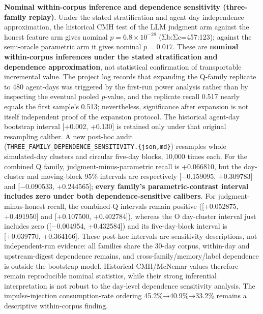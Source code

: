 \documentclass[
  11pt]{article}
\begin{document}
\textbf{Nominal within-corpus inference and dependence sensitivity
(three-family replay)}. Under the stated stratification and agent-day
independence approximation, the historical CMH test of the LLM judgment
arm against the honest feature arm gives nominal \(p=6.8\times10^{-28}\)
(Σb:Σc=457:123); against the semi-oracle parametric arm it gives nominal
\(p=0.017\). These are \textbf{nominal within-corpus inferences under
the stated stratification and dependence approximation}, not statistical
confirmation of transportable incremental value. The project log records
that expanding the Q-family replicate to 480 agent-days was triggered by
the first-run power analysis rather than by inspecting the eventual
pooled \(p\)-value, and the replicate recall 0.517 nearly equals the
first sample's 0.513; nevertheless, significance after expansion is not
itself independent proof of the expansion protocol. The historical
agent-day bootstrap interval {[}+0.002, +0.130{]} is retained only under
that original resampling caliber. A new post-hoc audit
(\texttt{THREE\_FAMILY\_DEPENDENCE\_SENSITIVITY.\{json,md\}}) resamples
whole simulated-day clusters and circular five-day blocks, 10,000 times
each. For the combined Q family, judgment-minus-parametric recall is
+0.066810, but the day-cluster and moving-block 95\% intervals are
respectively {[}−0.159095, +0.309783{]} and {[}−0.090533, +0.244565{]};
\textbf{every family's parametric-contrast interval includes zero under
both dependence-sensitive calibers}. For judgment-minus-honest recall,
the combined-Q intervals remain positive ({[}+0.052875, +0.491950{]} and
{[}+0.107500, +0.402784{]}), whereas the O day-cluster interval just
includes zero ({[}−0.004954, +0.432584{]}) and its five-day-block
interval is {[}+0.039770, +0.364166{]}. These post-hoc intervals are
sensitivity descriptions, not independent-run evidence: all families
share the 30-day corpus, within-day and upstream-digest dependence
remains, and cross-family/memory/label dependence is outside the
bootstrap model. Historical CMH/McNemar values therefore remain
reproducible nominal statistics, while their strong inferential
interpretation is not robust to the day-level dependence sensitivity
analysis. The impulse-injection consumption-rate ordering
45.2\%→40.9\%→33.2\% remains a descriptive within-corpus finding.
\end{document}
